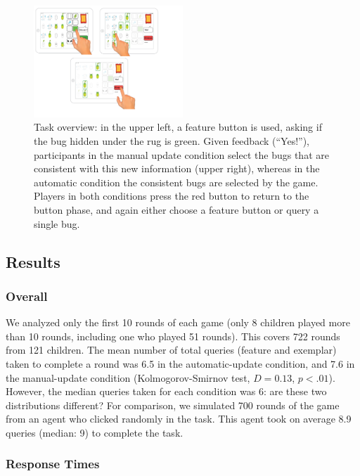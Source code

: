 \documentclass[10pt,letterpaper]{article}
\begin{document}
\begin{figure}[!h]
  \centering
  \includegraphics[width=0.5\textwidth]{figures/task_overview}
  \caption{Task overview: in the upper left, a feature button is used, asking if the bug 
hidden under the rug is green. Given feedback (``Yes!''), participants in the manual 
update condition select the bugs that are consistent with this new information (upper 
right), whereas in the automatic condition the consistent bugs are selected by the 
game. Players in both conditions press the red button to return to the button phase, 
and again either choose a feature button or query a single bug.}
  \label{fig:task-overview}
\end{figure} 


\subsection{Results}

\subsubsection{Overall}

We analyzed only the first 10 rounds of each game (only 8 children played more than 
10 rounds, including one who played 51 rounds). This covers 722 rounds from 121 
children. The mean number of total queries (feature 
and exemplar) taken to complete a round was 6.5 in the automatic-update condition, 
and 7.6 in the manual-update condition (Kolmogorov-Smirnov test, $D = 
0.13$, $p<.01$). However, the median queries taken for each 
condition was 6: are these two distributions different?  For comparison, 
we simulated 700 rounds of the game from an agent who clicked
randomly in the task.  This agent took on average 8.9 queries (median: 9) to complete the
task.  %

\subsubsection{Response Times}
\end{document}
